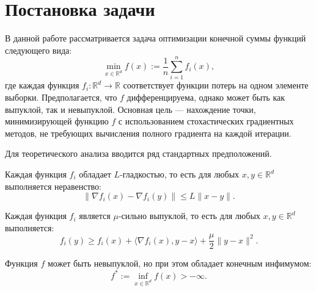 \section{Постановка задачи}

    В данной работе рассматривается задача оптимизации конечной суммы функций следующего вида:
\[
\min_{x \in \mathbb{R}^d} f(x) := \frac{1}{n} \sum_{i=1}^{n} f_i(x),
\]
где каждая функция \( f_i: \mathbb{R}^d \to \mathbb{R} \) соответствует функции потерь на одном элементе выборки. Предполагается, что \( f \) дифференцируема, однако может быть как выпуклой, так и невыпуклой. Основная цель — нахождение точки, минимизирующей функцию \( f \) с использованием стохастических градиентных методов, не требующих вычисления полного градиента на каждой итерации.

Для теоретического анализа вводится ряд стандартных предположений.

\begin{assumption}\label{ass:smoothness}
Каждая функция \( f_i \) обладает \( L \)-гладкостью, то есть для любых \( x, y \in \mathbb{R}^d \) выполняется неравенство:
\[
\|\nabla f_i(x) - \nabla f_i(y)\| \leq L \|x - y\|.
\]
\end{assumption}

\begin{assumption}\label{ass:strongconvex}
Каждая функция \( f_i \) является \( \mu \)-сильно выпуклой, то есть для любых \( x, y \in \mathbb{R}^d \) выполняется:
\[
f_i(y) \geq f_i(x) + \langle \nabla f_i(x), y - x \rangle + \frac{\mu}{2} \|y - x\|^2.
\]
\end{assumption}

\begin{assumption}[Невыпуклость]\label{ass:nonconvex}
Функция \( f \) может быть невыпуклой, но при этом обладает конечным инфимумом:
\[
f^* := \inf_{x \in \mathbb{R}^d} f(x) > -\infty.
\]
\end{assumption}
